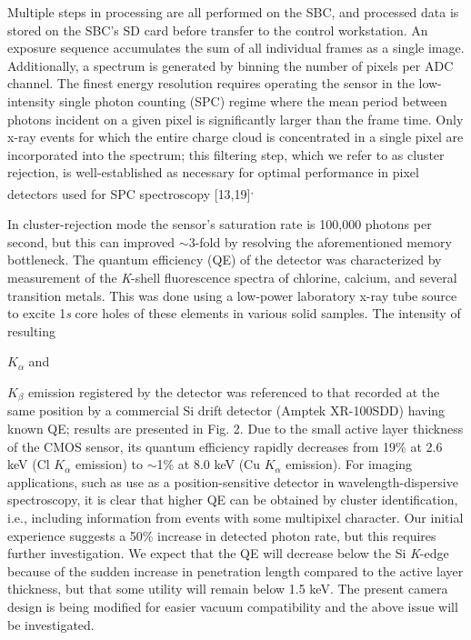 \FloatBarrier

Multiple steps in processing are all performed on the SBC, and processed
data is stored on the SBC's SD card before transfer to the control
workstation. An exposure sequence accumulates the sum of all individual
frames as a single image. Additionally, a spectrum is generated by
binning the number of pixels per ADC channel. The finest energy
resolution requires operating the sensor in the low-intensity single
photon counting (SPC) regime where the mean period between photons
incident on a given pixel is significantly larger than the frame time.
Only x-ray events for which the entire charge cloud is concentrated in a
single pixel are incorporated into the spectrum; this filtering step,
which we refer to as cluster rejection, is well-established as necessary
for optimal performance in pixel detectors used for SPC
spectroscopy {[}13,19{]}\textsuperscript{,}

In cluster-rejection mode the sensor's saturation rate is 100,000
photons per second, but this can improved $\sim$3-fold by
resolving the aforementioned memory bottleneck. The quantum efficiency
(QE) of the detector was characterized by measurement of the
\emph{K}-shell fluorescence spectra of chlorine, calcium, and several
transition metals. This was done using a low-power laboratory x-ray tube
source to excite 1\emph{s} core holes of these elements in various solid
samples. The intensity of resulting
\(K_{\alpha}\)
and
\(K_{\beta}\)
emission registered by the detector was referenced to that recorded at
the same position by a commercial Si drift detector (Amptek XR-100SDD)
having known QE; results are presented in Fig. 2. Due to the small
active layer thickness of the CMOS sensor, its quantum efficiency
rapidly decreases from 19\% at 2.6 keV (Cl \(K_{\alpha}\) emission) to
$\sim$1\% at 8.0 keV (Cu \(K_{\alpha}\) emission). For
imaging applications, such as use as a position-sensitive detector in
wavelength-dispersive spectroscopy, it is clear that higher QE can be
obtained by cluster identification, i.e., including information from
events with some multipixel character. Our initial experience suggests a
50\% increase in detected photon rate, but this requires further
investigation. We expect that the QE will decrease below the Si
\emph{K}-edge because of the sudden increase in penetration length
compared to the active layer thickness, but that some utility will
remain below 1.5 keV. The present camera design is being modified for
easier vacuum compatibility and the above issue will be investigated.

